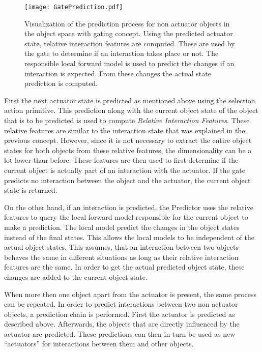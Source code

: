 \begin{figure}
	\centering
	\texttt{[image: GatePrediction.pdf]}
	\caption{Visualization of the prediction process for non actuator objects in the object space with gating concept. Using the predicted actuator state, relative interaction features are computed. These are used by the gate to determine if an interaction takes place or not. The responsible local forward model is used to predict the changes if an interaction is expected. From these changes the actual state prediction is computed.} 
	\label{fig:GatePrediction}
\end{figure}

First the next actuator state is predicted as mentioned above using the selection action primitive.
This prediction along with the current object state of the object that is to be predicted is used to compute \textit{Relative Interaction Features}. These relative features are similar to the interaction state that was explained in the previous concept. However, since it is not necessary to extract the entire object states for both objects from these relative features, the dimensionality can be a lot lower than before. These features are then used to first determine if the current object is actually part of an interaction with the actuator. If the gate predicts no interaction between the object and the actuator, the current object state is returned. 

On the other hand, if an interaction is predicted, the Predictor uses the relative features to query the local forward model responsible for the current object to make a prediction. The local model predict the changes in the object states instead of the final states. This allows the local models to be independent of the actual object states. This assumes, that an interaction between two objects behaves the same in different situations as long as their relative interaction features are the same. In order to get the actual predicted object state, these changes are added to the current object state.

When more then one object apart from the actuator is present, the same process can be repeated. In order to predict interactions between two non actuator objects, a prediction chain is performed. First the actuator is predicted as described above. Afterwards, the objects that are directly influenced by the actuator are predicted. These predictions can then in turn be used as new \enquote{actuators} for interactions between them and other objects. 

